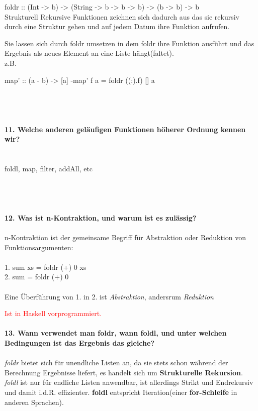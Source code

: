 \documentclass{article}
\begin{document}
foldr :: (Int -> b) -> (String -> b -> b -> b) -> (b -> b) -> b\\


Strukturell Rekursive Funktionen zeichnen sich dadurch aus das sie rekursiv durch eine Struktur gehen und auf jedem Datum ihre Funktion aufrufen.

Sie lassen sich durch foldr umsetzen in dem foldr ihre Funktion ausf\"uhrt und das Ergebnis als neues Element an eine Liste h\"angt(faltet).
\\
z.B.

map' :: (a -\> b) -> [a] -\> [b
]
map' f a = foldr ((:).f) [] a
\\
\\
\\
\\
\\
\textbf{11. Welche anderen geläufigen Funktionen höherer Ordnung kennen wir?}
\\
\\
\\
foldl, map, filter, addAll, etc
\\
\\
\\
\\
\\
\textbf{12. Was ist n-Kontraktion, und warum ist es zulässig?}\\
\\
n-Kontraktion ist der gemeinsame Begriff für Abstraktion oder Reduktion von Funktionsargumenten: \\
\\
1. sum xs = foldr (+) 0 xs\\
2. sum = foldr (+) 0\\
\\
Eine Überführung von 1. in 2. ist \textit{Abstraktion}, andersrum \textit{Reduktion}

\textcolor{red}{Ist in Haskell vorprogrammiert.}
\\
\\
\textbf{13. Wann verwendet man foldr, wann foldl, und unter welchen Bedingungen ist das Ergebnis das gleiche?}\\
\\
\emph{foldr} bietet sich für unendliche Listen an, da sie stets schon w\"ahrend der Berechnung Ergebnisse liefert, es handelt sich um \textbf{Strukturelle Rekursion}. \emph{foldl} ist nur für endliche Listen anwendbar, ist allerdings Strikt und Endrekursiv und damit i.d.R. effizienter. \textbf{foldl} entspricht Iteration(einer \textbf{for-Schleife} in anderen Sprachen).
\end{document}
